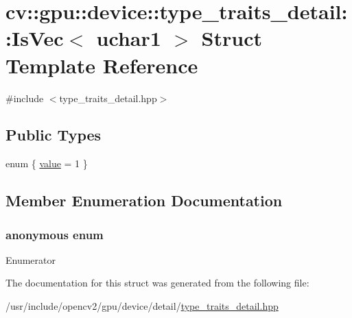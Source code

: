 \hypertarget{structcv_1_1gpu_1_1device_1_1type__traits__detail_1_1IsVec_3_01uchar1_01_4}{\section{cv\-:\-:gpu\-:\-:device\-:\-:type\-\_\-traits\-\_\-detail\-:\-:Is\-Vec$<$ uchar1 $>$ Struct Template Reference}
\label{structcv_1_1gpu_1_1device_1_1type__traits__detail_1_1IsVec_3_01uchar1_01_4}
}


{\ttfamily \#include $<$type\-\_\-traits\-\_\-detail.\-hpp$>$}

\subsection*{Public Types}
\begin{DoxyCompactItemize}
\item 
enum \{ \hyperlink{structcv_1_1gpu_1_1device_1_1type__traits__detail_1_1IsVec_3_01uchar1_01_4_a38b49d499781fea8bc4f79814420f88fa9e6107f6a838f66c0647dfa121517096}{value} = 1
 \}
\end{DoxyCompactItemize}


\subsection{Member Enumeration Documentation}
\hypertarget{structcv_1_1gpu_1_1device_1_1type__traits__detail_1_1IsVec_3_01uchar1_01_4_a38b49d499781fea8bc4f79814420f88f}{\subsubsection[{anonymous enum}]{\setlength{\rightskip}{0pt plus 5cm}anonymous enum}}\label{structcv_1_1gpu_1_1device_1_1type__traits__detail_1_1IsVec_3_01uchar1_01_4_a38b49d499781fea8bc4f79814420f88f}
\begin{Desc}
\item[Enumerator]\par
\begin{description}
\item[{\em 
\hypertarget{structcv_1_1gpu_1_1device_1_1type__traits__detail_1_1IsVec_3_01uchar1_01_4_a38b49d499781fea8bc4f79814420f88fa9e6107f6a838f66c0647dfa121517096}{value}\label{structcv_1_1gpu_1_1device_1_1type__traits__detail_1_1IsVec_3_01uchar1_01_4_a38b49d499781fea8bc4f79814420f88fa9e6107f6a838f66c0647dfa121517096}
}]\end{description}
\end{Desc}


The documentation for this struct was generated from the following file\-:\begin{DoxyCompactItemize}
\item 
/usr/include/opencv2/gpu/device/detail/\hyperlink{type__traits__detail_8hpp}{type\-\_\-traits\-\_\-detail.\-hpp}\end{DoxyCompactItemize}
